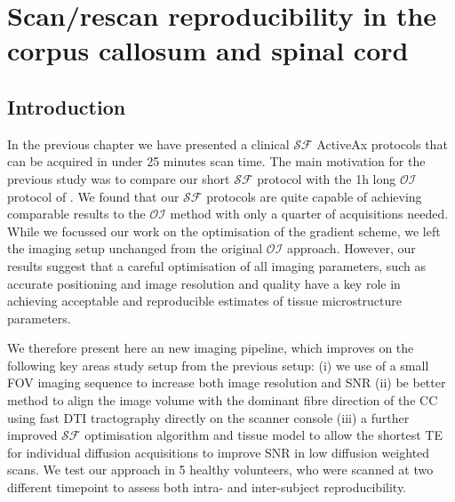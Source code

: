 \newcommand{\SF}{{\ensuremath{\mathcal{SF}}}}
\newcommand{\OI}{{\ensuremath{\mathcal{OI}}}}
\newcommand{\SD}{{\ensuremath{\mathcal{SF}_{pulses}}}}
\newcommand{\DO}{{\ensuremath{\mathcal{SF}_{dirs}}}}
\newcommand{\FD}{{\SF}}
\newcommand{\FDmod}{{\ensuremath{\FD_{mod}}}}
\newcommand{\SFasym}{{\ensuremath{a\mathcal{SF}}}}

\newcommand{\SFshort}{\SF$_{90}$}
\newcommand{\SFlong}{\SF$_{360}$}
\newcommand{\OIlong}{\OI$_{360}$}


\newsavebox{\poorBox}
\savebox{\poorBox}{\textcolor{red}{\rule{0.05in}{0.05in}}}
\newsavebox{\fairBox}
\savebox{\fairBox}{\textcolor{orange}{\rule{0.05in}{0.05in}}}
\newsavebox{\moderateBox}
\savebox{\moderateBox}{\textcolor{yellow}{\rule{0.05in}{0.05in}}}
\newsavebox{\substantialBox}
\savebox{\substantialBox}{\textcolor{lime}{\rule{0.05in}{0.05in}}}
\newsavebox{\perfectBox}
\savebox{\perfectBox}{\textcolor{green}{\rule{0.05in}{0.05in}}}


\chapter[Scan/rescan in the corpus callosum]{Scan/rescan reproducibility in the corpus callosum and spinal cord}
\section{Introduction}
In the previous chapter we have presented a clinical {\SF} ActiveAx protocols that can be acquired in under 25 minutes scan time. The main motivation for the previous study was to compare our short {\SF} protocol with the 1h long \OI{} protocol of \citep{Alexander:2010}. We found that our \SF{} protocols are quite capable of achieving comparable results to the \OI{} method with only a quarter of acquisitions needed. While we focussed our work on the optimisation of the gradient scheme, we left the imaging setup unchanged from the original \OI{} approach. However, our results suggest that a careful optimisation of all imaging parameters, such as accurate positioning and image resolution and quality have a key role in achieving acceptable and reproducible estimates of tissue microstructure parameters. 


We therefore present here an new imaging pipeline, which improves on the following key areas study setup from the previous setup: (i) we use of a small \gls{FOV} imaging sequence to increase both image resolution and SNR (ii) be better method to align the image volume with the dominant fibre direction of the CC using fast DTI tractography directly on the scanner console (iii) a further improved \SF{} optimisation algorithm and tissue model to allow the shortest \gls{TE} for individual diffusion acquisitions to improve SNR in low diffusion weighted scans.  We test our approach in 5 healthy volunteers, who were scanned at two different timepoint to assess both intra- and inter-subject reproducibility. 


